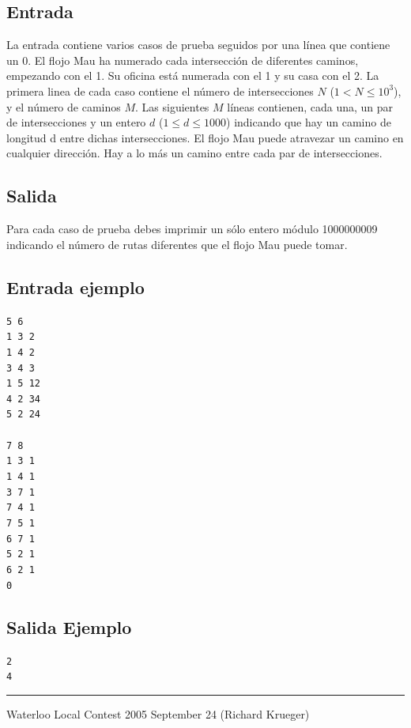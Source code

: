 \documentclass[letter,10pt]{article}
\newcommand{\lyxaddress}[1]{
\par {\raggedright #1
\vspace{1.4em}
\noindent\par}
}
\begin{document}
\subsection*{Entrada}

La entrada contiene varios casos de prueba seguidos por una línea que contiene un 0. El flojo Mau ha numerado cada intersección de diferentes caminos, empezando con el 1. Su oficina está numerada con el 1 y su casa con el 2. La primera linea de cada caso contiene el número de intersecciones $N$ ($1 < N \leq 10^3$), y el número de caminos $M$. Las siguientes $M$ líneas contienen, cada una, un par de intersecciones y un entero $d$ ($1 \leq d \leq 1000$) indicando que hay un camino de longitud d entre dichas intersecciones. El flojo Mau puede atravezar un camino en cualquier dirección. Hay a lo más un camino entre cada par de intersecciones.

\subsection*{Salida}

Para cada caso de prueba debes imprimir un sólo entero módulo 1000000009 indicando el número de rutas diferentes que el flojo Mau puede tomar.

\subsection*{Entrada ejemplo}
\noindent \texttt{5 6}~\\
\texttt{1 3 2}~\\
\texttt{1 4 2}~\\
\texttt{3 4 3}~\\
\texttt{1 5 12}~\\
\texttt{4 2 34}~\\
\texttt{5 2 24}~\\\\
$$$$
$$$$
$$$$
$$$$
$$$$
$$$$
$$$$
\texttt{7 8}~\\
\texttt{1 3 1}~\\
\texttt{1 4 1}~\\
\texttt{3 7 1}~\\
\texttt{7 4 1}~\\
\texttt{7 5 1}~\\
\texttt{6 7 1}~\\
\texttt{5 2 1}~\\
\texttt{6 2 1}~\\
\texttt{0}~\\
\noindent 

\subsection*{Salida Ejemplo}

\noindent \texttt{2}~\\
\texttt{4}~\\

\noindent \rule[0.5ex]{1\columnwidth}{1pt}


\lyxaddress{Waterloo Local Contest 2005 September 24 (Richard Krueger)}
\end{document}
